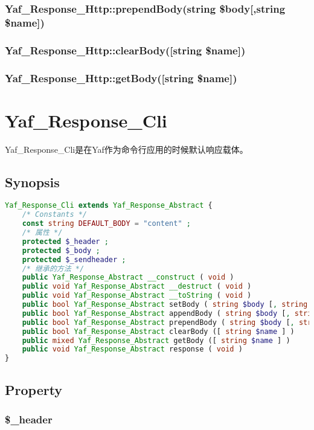 \subsection{Yaf\_Response\_Http::prependBody(string \$body[,string \$name])}
\subsection{Yaf\_Response\_Http::clearBody([string \$name])}
\subsection{Yaf\_Response\_Http::getBody([string \$name])}

\chapter{Yaf\_Response\_Cli}

Yaf\_Response\_Cli是在Yaf作为命令行应用的时候默认响应载体。

\section{Synopsis}



\begin{lstlisting}[language=PHP]
Yaf_Response_Cli extends Yaf_Response_Abstract {
    /* Constants */
    const string DEFAULT_BODY = "content" ;
    /* 属性 */
    protected $_header ;
    protected $_body ;
    protected $_sendheader ;
    /* 继承的方法 */
    public Yaf_Response_Abstract __construct ( void )
    public void Yaf_Response_Abstract __destruct ( void )
    public void Yaf_Response_Abstract __toString ( void )
    public bool Yaf_Response_Abstract setBody ( string $body [, string $name ] )
    public bool Yaf_Response_Abstract appendBody ( string $body [, string $name ] )
    public bool Yaf_Response_Abstract prependBody ( string $body [, string $name ] )
    public bool Yaf_Response_Abstract clearBody ([ string $name ] )
    public mixed Yaf_Response_Abstract getBody ([ string $name ] )
    public void Yaf_Response_Abstract response ( void )
}
\end{lstlisting}


\section{Property}

\subsection{\$\_header}


